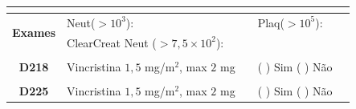 \documentclass[11pt,a4paper,oldfontcommands]{memoir}
\begin{document}
\begin{center}
\begin{table}[H]
\begin{tabular}{p{1cm}p{6cm}|p{1cm}|p{3cm}|p{2.5cm}}
    \multicolumn{1}{c|}{\multirow{1}{*}{\textbf{}}}&&&&\\
    \hline
    \multicolumn{1}{c|}{\multirow{2}{*}{\textbf{Exames}}}&\multicolumn{2}{l|}{Neut(\(>10^3\)):}&{Plaq(\(>10^5\)):}&\\
    \cline{2-5}
    \multicolumn{1}{c|}{\multirow{2}{*}{{}}}&\multicolumn{2}{l|}{ClearCreat Neut (\(>7,5\times10^2\)):}&{}&{}\\
    \hline
    \\
    \hline
    \multicolumn{1}{c|}{\multirow{1}{*}{\textbf{D218}}}&{Vincristina \(1,5\) mg/m\(^2\), max \(2\) mg}&&{(  ) Sim (  ) Não}&\\
    \hline
    \\
    \hline
    \multicolumn{1}{c|}{\multirow{1}{*}{\textbf{D225}}}&{Vincristina \(1,5\) mg/m\(^2\), max \(2\) mg}&&{(  ) Sim (  ) Não}&\\
    \hline
    \end{tabular}
    \end{table}
    

\end{center}
\end{document}
